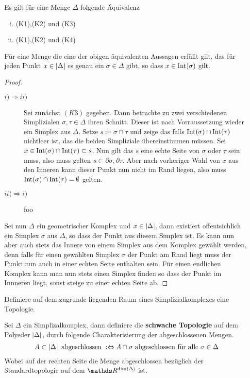 \begin{Lem}\label{lem:eindeutigSimplex}
  Es gilt für eine Menge $\Delta$ folgende Äquivalenz
  \begin{enumerate}[(i)]
  \item (K1),(K2) und (K3)
  \item (K1),(K2) und (K4)
  \end{enumerate}
  Für eine Menge die eine der obigen äquivalenten Aussagen erfüllt
  gilt, das für jeden Punkt $x \in \left| \Delta \right|$ es genau ein
  $\sigma \in \Delta$ gibt, so dass $x \in \operatorname{Int}(\sigma)$ gilt.
  \begin{proof}
    \begin{description}
    \item[$i) \Rightarrow ii)$] Sei zunächst $(K3)$ gegeben. Dann
      betrachte zu zwei verschiedenen Simplizialen
      $\sigma,\tau \in \Delta$ ihren Schnitt. Dieser ist nach
      Vorraussetzung wieder ein Simplex aus $\Delta$. Setze
      $s \coloneqq \sigma \cap \tau$ und zeige das falls
      $\operatorname{Int}(\sigma) \cap \operatorname{Int}(\tau)$ nichtleer ist, das die beiden
      Simpliziale übereinstimmen müssen. Sei
      $x \in \operatorname{Int}(\sigma) \cap \operatorname{Int}(\tau) \subset s$. Nun gilt das $s$
      eine echte Seite von $\sigma$ oder $\tau$ sein muss, also muss
      gelten $s \subset \partial\sigma , \partial\tau$. Aber nach
      vorheriger Wahl von $x$ aus den Inneren kann dieser Punkt nun
      nicht im Rand liegen, also muss
      $\operatorname{Int}(\sigma) \cap \operatorname{Int}(\tau) = \emptyset$ gelten.
      \item[$ii) \Rightarrow i)$] foo
    \end{description}
    Sei nun $\Delta$ ein geometrischer Komplex und
    $x \in \left| \Delta \right|$, dann existiert offentsichlich ein Simplex
    $\sigma$ aus $\Delta$, so dass der Punkt aus diesem Simplex
    ist. Es kann nun aber auch stets das Innere von einem Simplex aus
    dem Komplex gewählt werden, denn falls für einen gewählten Simplex
    $\sigma$ der Punkt am Rand liegt muss der Punkt nun auch in einer
    echten Seite enthalten sein. Für einen endlichen Komplex kann man
    nun stets einen Simplex finden so dass der Punkt im Innneren
    liegt, sonst steige zu einer echten Seite ab.
  \end{proof}
\end{Lem}



Definiere auf dem zugrunde liegenden Raum eines Simplizialkomplexes eine 
Topologie.

\begin{Def}
	Sei $\Delta$ ein Simplizalkomplex, dann definiere die
	\textbf{schwache Topologie} auf dem Polyeder $\left| \Delta \right|$,
	durch folgende Charakterisierung der abgeschlossenen Mengen.
	\begin{gather*}
          A \subset \left| \Delta \right| \text{ abgeschlossen }
          :\Leftrightarrow A \cap \sigma \text{ abgeschlossen für alle
          } \sigma \in \Delta
	\end{gather*}
	Wobei auf der rechten Seite die Menge abgeschlossen bezüglich der
	Standardtopologie auf dem $\R^{\dim(\Delta)}$ ist.
\end{Def}

